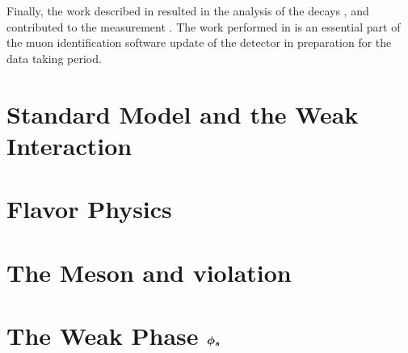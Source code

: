 Finally, the work described in  resulted in the analysis of the \BsJpsiKst
decays \cite{bsjpsikst-paper}, and contributed to the \phis measurement \cite{phis-3fb-paper}.
The work performed in  is an essential part of the muon identification
software update \cite{Albrecht:2253050} of the \lhcb detector in preparation for the \runtwo data taking period.

\section{Standard Model and the Weak Interaction}
\label{The_Standard_Model}


\section{Flavor Physics}
\label{Flavor_Physics}


\section{The \Bs Meson and \CP violation}
\label{Phenomenology}


\section{The Weak Phase $\boldsymbol{\phi_{s}}$}
\label{WeakPhase}


